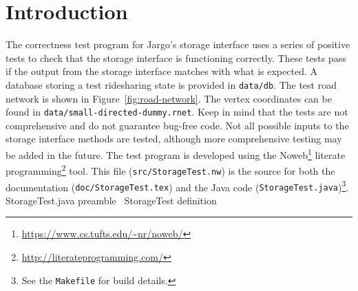 \documentclass{article}
\def\nwendcode{\endtrivlist \endgroup}
\let\nwdocspar=\par
\begin{document}
\section{Introduction}
\label{sec:introduction}
The correctness test program for Jargo's storage interface uses a series of
positive tests to check that the storage interface is functioning correctly.
These tests pass if the output from the storage interface matches with what is
expected. A database storing a test ridesharing state is provided in
{\tt{}data/db}.  The test road network is shown in Figure~\ref{fig:road-network}.
The vertex coordinates can be found in {\tt{}data/small-directed-dummy.rnet}.
Keep in mind that the tests are not comprehensive and do not guarantee bug-free
code. Not all possible inputs to the storage interface methods are tested,
although more comprehensive testing may be added in the future.
The test program is developed using the
Noweb\footnote{\url{https://www.cs.tufts.edu/~nr/noweb/}} literate
programming\footnote{\url{http://literateprogramming.com/}} tool.  This file
({\tt{}src/StorageTest.nw}) is the source for both the documentation
({\tt{}doc/StorageTest.tex}) and the Java code ({\tt{}StorageTest.java})\footnote{See the
{\tt{}Makefile} for build details.}.
\endmoddef{}
\LA{}StorageTest.java preamble~{\nwtagstyle{}}\RA{}
\LA{}\code{}StorageTest\edoc{} definition~{\nwtagstyle{}}\RA{}
\nwendcode{}\nwdocspar
\end{document}

